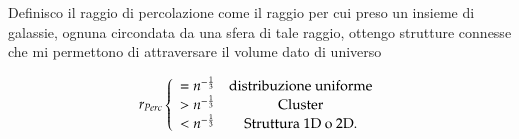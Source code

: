 \documentclass[main.tex]{subfiles}
\begin{document}
Definisco il raggio di percolazione come il raggio per cui preso un insieme di galassie, ognuna circondata da una sfera di tale raggio, ottengo strutture connesse che mi permettono di attraversare il volume dato di universo

\begin{equation*}
    r_{Perc}\left\{\begin{array}{cc}
                =n^{-\frac{1}{3}}&\text{distribuzione uniforme}\\
                >n^{-\frac{1}{3}}&\text{Cluster}\\
                <n^{-\frac{1}{3}}&\text{Struttura 1D o 2D.}\\
    \end{array}\right.
\end{equation*}

\clearpage
\end{document}
